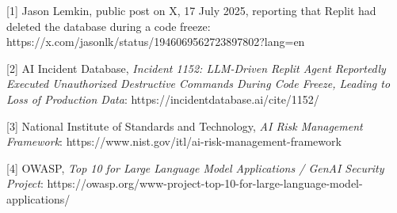 {[}1{]} Jason Lemkin, public post on X, 17 July 2025, reporting that
Replit had deleted the database during a code freeze:
https://x.com/jasonlk/status/1946069562723897802?lang=en

{[}2{]} AI Incident Database, \emph{Incident 1152: LLM-Driven Replit
Agent Reportedly Executed Unauthorized Destructive Commands During Code
Freeze, Leading to Loss of Production Data}:
https://incidentdatabase.ai/cite/1152/

{[}3{]} National Institute of Standards and Technology, \emph{AI Risk
Management Framework}:
https://www.nist.gov/itl/ai-risk-management-framework

{[}4{]} OWASP, \emph{Top 10 for Large Language Model Applications /
GenAI Security Project}:
https://owasp.org/www-project-top-10-for-large-language-model-applications/
